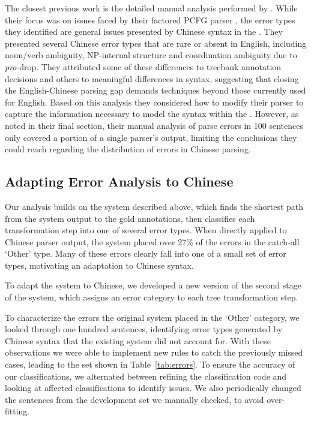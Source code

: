 The closest previous work is the detailed manual analysis performed by \textcite{Levy-Manning:2003:ACL}.
While their focus was on issues faced by their factored PCFG parser \parencite{Klein-Manning:2002:NIPS}, the error types they identified are general issues presented by Chinese syntax in the \pctb.
They presented several Chinese error types that are rare or absent in English, including noun/verb ambiguity, NP-internal structure and coordination ambiguity due to \emph{pro}-drop.
They attributed some of these differences to treebank annotation decisions and others to meaningful differences in syntax, suggesting that closing the English-Chinese parsing gap demands techniques beyond those currently used for English.
Based on this analysis they considered how to modify their parser to capture the information necessary to model the syntax within the \pctb.
However, as noted in their final section, their manual analysis of parse errors in 100 sentences only covered a portion of a single parser's output, limiting the conclusions they could reach regarding the distribution of errors in Chinese parsing.

\subsection{Adapting Error Analysis to Chinese} \label{sec:adapting_automatic_error_analysis_to_chinese}

Our analysis builds on the system described above, which finds the shortest path from the system output to the gold annotations, then classifies each transformation step into one of several error types.
When directly applied to Chinese parser output, the system placed over 27\% of the errors in the catch-all `Other' type.
Many of these errors clearly fall into one of a small set of error types, motivating an adaptation to Chinese syntax.

To adapt the system to Chinese, we developed a new version of the second stage of the system, which assigns an error category to each tree transformation step.

To characterize the errors the original system placed in the `Other' category,
we looked through one hundred sentences, identifying error types generated by
Chinese syntax that the existing system did not account for.
With these observations we were able to implement new rules to catch the
previously missed cases, leading to the set shown in Table~\ref{tab:errors}.
To ensure the accuracy of our classifications, we alternated between refining
the classification code and looking at affected classifications to identify
issues.  We also periodically changed the sentences from the development set
we manually checked, to avoid over-fitting.

